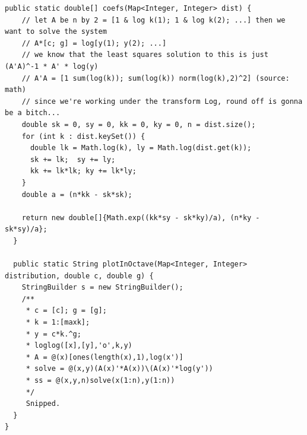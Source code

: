 \documentclass[11pt,a4paper,twocolumn]{article}
\begin{document}
\begin{singlespace}
\begin{appendices}
\begin{lstlisting}[caption={AnalysisState.java}]
  public static double[] coefs(Map<Integer, Integer> dist) {
    // let A be n by 2 = [1 & log k(1); 1 & log k(2); ...] then we want to solve the system
    // A*[c; g] = log[y(1); y(2); ...]
    // we know that the least squares solution to this is just (A'A)^-1 * A' * log(y)
    // A'A = [1 sum(log(k)); sum(log(k)) norm(log(k),2)^2] (source: math)
    // since we're working under the transform Log, round off is gonna be a bitch...
    double sk = 0, sy = 0, kk = 0, ky = 0, n = dist.size();
    for (int k : dist.keySet()) {
      double lk = Math.log(k), ly = Math.log(dist.get(k));
      sk += lk;  sy += ly;
      kk += lk*lk; ky += lk*ly;
    }
    double a = (n*kk - sk*sk);

    return new double[]{Math.exp((kk*sy - sk*ky)/a), (n*ky - sk*sy)/a};
  }

  public static String plotInOctave(Map<Integer, Integer> distribution, double c, double g) {
    StringBuilder s = new StringBuilder();
    /**
     * c = [c]; g = [g];
     * k = 1:[maxk];
     * y = c*k.^g;
     * loglog([x],[y],'o',k,y)
     * A = @(x)[ones(length(x),1),log(x')]
     * solve = @(x,y)(A(x)'*A(x))\(A(x)'*log(y'))
     * ss = @(x,y,n)solve(x(1:n),y(1:n))
     */
     Snipped.
  }
}
\end{lstlisting}
\end{appendices}



\end{singlespace}
\end{document}
